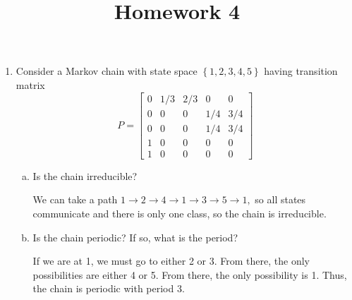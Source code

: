 \documentclass{article}
\begin{document}
\title{Homework 4}
\maketitle
\thispagestyle{fancy}

\begin{enumerate}
	\item Consider a Markov chain with state space $\left\{ 1, 2, 3, 4, 5 \right\}$ having transition matrix
		\[P=\begin{bmatrix}
				0 & 1/3 & 2/3 & 0 & 0 \\
				0 & 0 & 0 & 1/4 & 3/4 \\
				0 & 0 & 0 & 1/4 & 3/4 \\
				1 & 0 & 0 & 0 & 0 \\
				1 & 0 & 0 & 0 & 0
		\end{bmatrix}\]

		\begin{enumerate}[(a)]
			\item Is the chain irreducible?
				\begin{answer*}
					We can take a path $1\to 2\to 4\to1\to3\to5\to1,$ so all states communicate and there is only one class, so the chain is irreducible.
				\end{answer*}

			\item Is the chain periodic? If so, what is the period?
				\begin{answer*}
					If we are at 1, we must go to either 2 or 3. From there, the only possibilities are either 4 or 5. From there, the only possibility is 1. Thus, the chain is periodic with period 3.
				\end{answer*}


\end{enumerate}
\end{enumerate}
\end{document}
